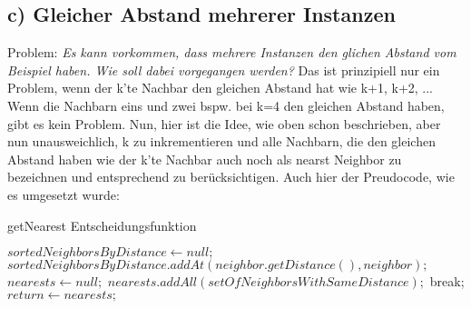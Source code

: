\documentclass[11pt, oneside]{article}
\begin{document}
\subsection{c) Gleicher Abstand mehrerer Instanzen}
Problem: \textit{Es kann vorkommen, dass mehrere Instanzen den glichen Abstand vom Beispiel haben. Wie soll dabei vorgegangen werden?}\newline
Das ist prinzipiell nur ein Problem, wenn der k'te Nachbar den gleichen Abstand hat wie k+1, k+2, ... 
Wenn die Nachbarn eins und zwei bspw. bei k=4 den gleichen Abstand haben, gibt es kein Problem.\newline
Nun, hier ist die Idee, wie oben schon beschrieben, aber nun unausweichlich, k zu inkrementieren und alle Nachbarn, die den gleichen Abstand haben wie der k'te Nachbar auch noch als nearst Neighbor zu bezeichnen und entsprechend zu berücksichtigen.\newline
Auch hier der Preudocode, wie es umgesetzt wurde:

\begin{algorithm}[H]
\caption{getNearest Entscheidungsfunktion}\label{euclid}
\begin{algorithmic}[1]

\State $sortedNeighborsByDistance \gets null;$
	\State $sortedNeighborsByDistance.addAt(neighbor.getDistance(), neighbor);$
\EndFor
\State $nearests \gets null;$
	\State $nearests.addAll(setOfNeighborsWithSameDistance);$
		\State break;
	\EndIf
\EndFor
\State $return \gets nearests;$

\EndFunction
\end{algorithmic}
\end{algorithm}
\end{document}

